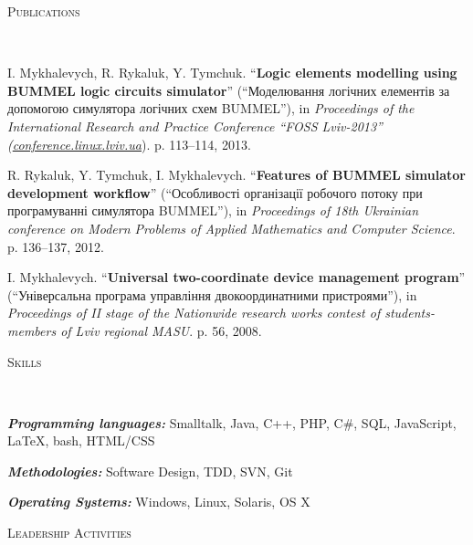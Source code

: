 \documentclass{article}
\newenvironment{changemargin}[2]{%
  \begin{list}{}{%
    \setlength{\topsep}{0pt}%
    \setlength{\leftmargin}{#1}%
    \setlength{\rightmargin}{#2}%
    \setlength{\listparindent}{\parindent}%
    \setlength{\itemindent}{\parindent}%
    \setlength{\parsep}{\parskip}%
  }%
  \item[]}{\end{list}
}
\newcommand{\lineover}{
  \begin{changemargin}{-1mm}{-1mm}
    \vspace*{-8pt}
    \hrulefill \\
    \vspace*{-2pt}
  \end{changemargin}
}
\newcommand{\header}[1]{
  \begin{changemargin}{-12mm}{-12mm}
    \scshape{#1}\\
    \lineover
  \end{changemargin}
}
\newenvironment{body}{
  \vspace*{-16pt}
  \begin{changemargin}{-6mm}{-12mm}
}{
  \end{changemargin}
}
\begin{document}
\smallskip

\header{Publications}

\begin{body}
  \vspace{14pt}
  I. Mykhalevych, R. Rykaluk, Y. Tymchuk. ``\textbf{Logic elements modelling using BUMMEL logic circuits simulator}'' (``Моделювання логічних елементів за допомогою симулятора логічних схем BUMMEL''), in \emph{Proceedings of the International Research and Practice Conference “FOSS Lviv-2013” (\href{http://conference.linux.lviv.ua}{conference.linux.lviv.ua}}). p. 113--114, 2013.\\
  \medskip

  R. Rykaluk, Y. Tymchuk, I. Mykhalevych. ``\textbf{Features of BUMMEL simulator development workflow}'' (``Особливості організації робочого потоку при програмуванні симулятора BUMMEL''), in \emph{Proceedings of 18th Ukrainian conference on Modern Problems of Applied Mathematics and Computer Science}. p. 136--137, 2012.\\
  \medskip

  I. Mykhalevych. ``\textbf{Universal two-coordinate device management program}'' (``Універсальна програма управління двокоординатними пристроями''), in \emph{Proceedings of II stage of the Nationwide research works contest of students-members of Lviv regional MASU}. p. 56, 2008.\\

\end{body}

\smallskip

\header{Skills}

\begin{body}
  \vspace{14pt}
  \emph{\textbf{Programming languages:}}{} Smalltalk, Java, C++, PHP, C\#, SQL, JavaScript, \LaTeX, bash, HTML/CSS
  \medskip
  
  \emph{\textbf{Methodologies:}}{} Software Design, TDD, SVN, Git
  \medskip
  
  \emph{\textbf{Operating Systems:}}{} Windows, Linux, Solaris, OS X
\end{body}

\smallskip


\header{Leadership Activities}
\end{document}
